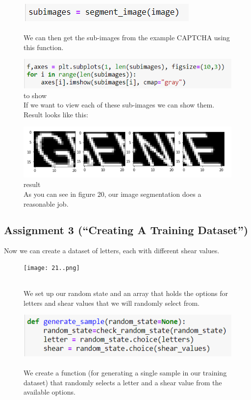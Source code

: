 \documentclass[onecolumn]{article}
\begin{document}
\newpage
\begin{figure}[h]
    \centering
    \includegraphics[width=.4\linewidth]{18..png}
\caption{\label{fig:demo-bad}
\centering
\\We can then get the sub-images from the example CAPTCHA using this function.}
\end{figure}

\begin{figure}[h]
    \centering
    \includegraphics[width=.6\linewidth]{19..png}
\caption{\label{fig:demo-bad}
\centering
to show\\If we want to view each of these sub-images we can show them. Result looks like this:}
\end{figure}

\begin{figure}[h]
    \centering
    \includegraphics[width=.4\linewidth]{20..png}
\caption{\label{fig:demo-bad}
\centering
result\\As you can see in figure 20, our image segmentation does a reasonable job.}
\end{figure}

\subsection{Assignment 3 (``Creating A Training Dataset'')}
\begin{t}
Now we can create a dataset of letters, each with different shear values.
\end{t}

\begin{figure}[hb!]
    \centering
    \texttt{[image: 21..png]}
\caption{\label{fig:demo-bad}
\centering
 \\We  set up our random state and an array that holds the options for letters and shear values that we will randomly select from.}
\end{figure}

\begin{figure}[hb!]
    \centering
    \includegraphics[width=.6\linewidth]{22..png}
\caption{\label{fig:demo-bad}
\centering
 \\We  create a function (for generating a single sample in our training dataset)
that randomly selects a letter and a shear value from the available options.}
\end{figure}
\end{document}
